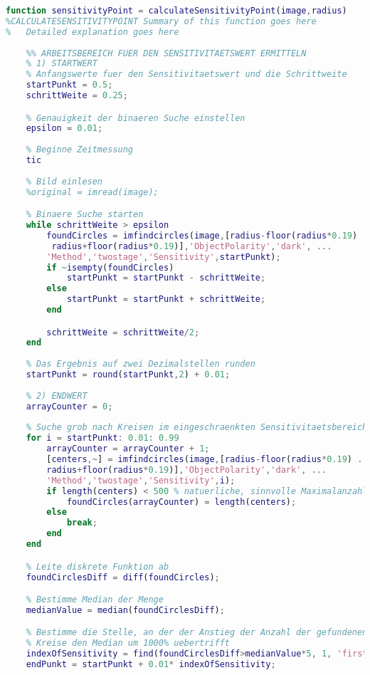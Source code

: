 \begin{lstlisting}[language=MATLAB, caption=Verfeinerung der lokalen Minima, label=lst:calculateSensitivityPoint]
function sensitivityPoint = calculateSensitivityPoint(image,radius)
%CALCULATESENSITIVITYPOINT Summary of this function goes here
%   Detailed explanation goes here
    
    %% ARBEITSBEREICH FUER DEN SENSITIVITAETSWERT ERMITTELN
    % 1) STARTWERT
    % Anfangswerte fuer den Sensitivitaetswert und die Schrittweite
    startPunkt = 0.5;
    schrittWeite = 0.25;

    % Genauigkeit der binaeren Suche einstellen
    epsilon = 0.01;
    
    % Beginne Zeitmessung
    tic
    
    % Bild einlesen
    %original = imread(image);

    % Binaere Suche starten
    while schrittWeite > epsilon
        foundCircles = imfindcircles(image,[radius-floor(radius*0.19) ...
         radius+floor(radius*0.19)],'ObjectPolarity','dark', ...
        'Method','twostage','Sensitivity',startPunkt);
        if ~isempty(foundCircles)
            startPunkt = startPunkt - schrittWeite;
        else
            startPunkt = startPunkt + schrittWeite;
        end

        schrittWeite = schrittWeite/2;
    end
    
    % Das Ergebnis auf zwei Dezimalstellen runden
    startPunkt = round(startPunkt,2) + 0.01;
    
    % 2) ENDWERT
    arrayCounter = 0;
    
    % Suche grob nach Kreisen im eingeschraenkten Sensitivitaetsbereich
    for i = startPunkt: 0.01: 0.99
        arrayCounter = arrayCounter + 1;
        [centers,~] = imfindcircles(image,[radius-floor(radius*0.19) ... 
        radius+floor(radius*0.19)],'ObjectPolarity','dark', ...
        'Method','twostage','Sensitivity',i);
        if length(centers) < 500 % natuerliche, sinnvolle Maximalanzahl in einem Bild
            foundCircles(arrayCounter) = length(centers);
        else
            break;
        end
    end

    % Leite diskrete Funktion ab
    foundCirclesDiff = diff(foundCircles);

    % Bestimme Median der Menge
    medianValue = median(foundCirclesDiff);

    % Bestimme die Stelle, an der der Anstieg der Anzahl der gefundenen 
    % Kreise den Median um 1000% uebertrifft
    indexOfSensitivity = find(foundCirclesDiff>medianValue*5, 1, 'first');
    endPunkt = startPunkt + 0.01* indexOfSensitivity;
    

\end{lstlisting}
